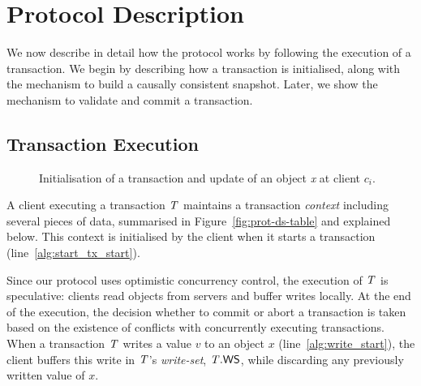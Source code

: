 \section{Protocol Description}

We now describe in detail how the protocol works by following the execution of a transaction. We begin by describing how a transaction is initialised, along with the mechanism to build a causally consistent snapshot. Later, we show the mechanism to validate and commit a transaction.

\subsection{Transaction Execution}
\label{subsect:protocol_execution}

\begin{figure}[h]
\begin{algorithm}[H]
  \setcounter{AlgoLine}{0}

  \smallskip

\end{algorithm}
\caption{Initialisation of a transaction and update of an object \emph{x} at client $c_i$.}
\end{figure}

A client executing a transaction $\mathit{T}$ maintains a transaction \emph{context} including several pieces of data, summarised in Figure~\ref{fig:prot-ds-table} and explained below. This context is initialised by the client when it starts a transaction (line~\ref{alg:start_tx_start}).

Since our protocol uses optimistic concurrency control, the execution of $\mathit{T}$ is speculative: clients read objects from servers and buffer writes locally. At the end of the execution, the decision whether to commit or abort a transaction is taken based on the existence of conflicts with concurrently executing transactions. When a transaction $\mathit{T}$ writes a value $v$ to an object $x$ (line~\ref{alg:write_start}), the client buffers this write in $\mathit{T}$'s \emph{write-set}, $\mathit{T}.\mathsf{WS}$, while discarding any previously written value of $x$.

